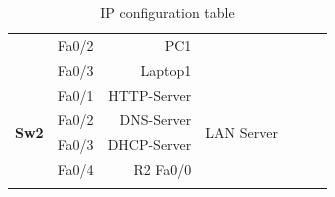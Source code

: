 \documentclass[11pt,a4paper]{report}
\begin{document}
\begin{longtable}[c]{@{}llrllrr@{}}
                                                   & Fa0/2                        & PC1                       &                                                       & \multicolumn{3}{c}{}                                                                                                                                                 \\
                                                   & Fa0/3                        & Laptop1                   &                                                       & \multicolumn{3}{c}{}                                                                                                                                                 \\* \midrule
\multirow{4}{*}{\textbf{Sw2}}                      & Fa0/1                        & HTTP-Server               & \multirow{4}{*}{LAN Server}                           & \multicolumn{3}{c}{\multirow{4}{*}{}}                                                                                                                                \\
                                                   & Fa0/2                        & DNS-Server                &                                                       & \multicolumn{3}{c}{}                                                                                                                                                 \\
                                                   & Fa0/3                        & DHCP-Server               &                                                       & \multicolumn{3}{c}{}                                                                                                                                                 \\
                                                   & Fa0/4                        & R2 Fa0/0                  &                                                       & \multicolumn{3}{c}{}                                                                                                                                                 \\* \bottomrule
\caption{IP configuration table}
\label{tab:ipconftable}\\
\end{longtable}
\end{document}
